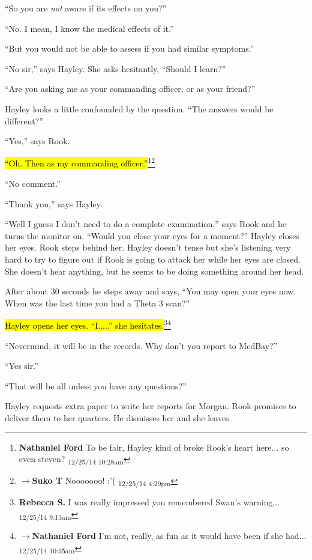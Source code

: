 ``So you are \textit{not} aware if its effects on you?''

``No.  I mean, I know the medical effects of it.''

``But you would not be able to assess if you had similar symptoms.''

``No sir,'' says Hayley.  She asks hesitantly, ``Should I learn?''

``Are you asking me as your commanding officer, or as your friend?''

Hayley looks a little confounded by the question.  ``The answers would be different?''

``Yes,'' says Rook.

\hl{``Oh.  Then as my commanding officer.''}\footnote{\textbf{Nathaniel Ford }To be fair, Hayley kind of broke Rook's heart here... so even steven? \textsubscript{12/25/14 10:28am}}\footnote{$\rightarrow$\textbf{Suko T }Nooooooo!   :'( \textsubscript{12/25/14 4:20pm}}

``No comment.''

``Thank you,'' says Hayley.



``Well I guess I don't need to do a complete examination,'' says Rook and he turns the monitor on.  ``Would you close your eyes for a moment?''  Hayley closes her eyes.  Rook steps behind her.  Hayley doesn't tense but she's listening very hard to try to figure out if Rook is going to attack her while her eyes are closed.  She doesn't hear anything, but he seems to be doing something around her head.



After about 30 seconds he steps away and says, ``You may open your eyes now.  When was the last time you had a Theta 3 scan?''

\hl{Hayley opens her eyes.  ``I.....'' she hesitates.}\footnote{\textbf{Rebecca S. }I was really impressed you remembered Swan's warning... \textsubscript{12/25/14 9:13am}}\footnote{$\rightarrow$\textbf{Nathaniel Ford }I'm not, really, as fun as it would have been if she had... \textsubscript{12/25/14 10:35am}}

``Nevermind, it will be in the records.  Why don't you report to MedBay?''

``Yes sir.''

``That will be all unless you have any questions?''

Hayley requests extra paper to write her reports for Morgan.  Rook promises to deliver them to her quarters.  He dismisses her and she leaves.



